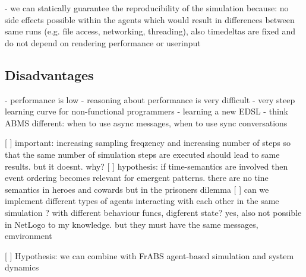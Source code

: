 	- we can statically guarantee the reproducibility of the simulation because: no side effects possible within the agents which would result in differences between same runs (e.g. file access, networking, threading), also timedeltas are fixed and do not depend on rendering performance or userinput	
	
\subsection{Disadvantages}
	- performance is low
	- reasoning about performance is very difficult
	- very steep learning curve for non-functional programmers
	- learning a new EDSL
	- think ABMS different: when to use async messages, when to use sync conversations


[ ] important: increasing sampling freqzency and increasing number of steps so that the same number of simulation steps are executed should lead to same results. but it doesnt. why?
[ ] hypothesis: if time-semantics are involved then event ordering becomes relevant for emergent patterns. there are no tine semantics in heroes and cowards but in the prisoners dilemma
[ ] can we implement different types of agents interacting with each other in the same simulation ? with different behaviour funcs, digferent state? yes, also not possible in NetLogo to my knowledge. but they must have the same messages, emvironment 

[ ] Hypothesis: we can combine with FrABS agent-based simulation and system dynamics